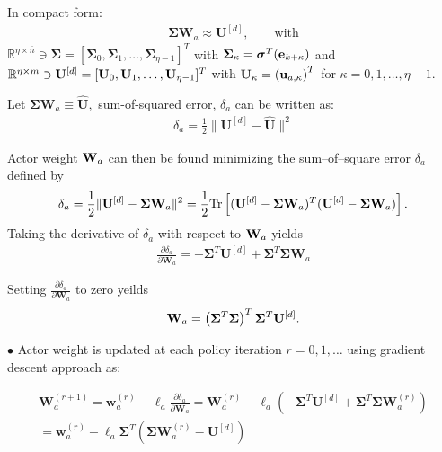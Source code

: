 \documentclass{beamer}
\begin{document}
\begin{frame}
  In compact form:
  \begin{align*}
    \bm{\Sigma}\mathbf{W}_a \approx  \mathbf{U}^{[d]},\qquad\text{with}
  \end{align*}
  $\mathbb{R}^{\eta\times\bar{n}}\ni \bm{\Sigma} = [\bm{\Sigma}_0,\bm{\Sigma}_1,\ldots,\bm{\Sigma}_{\eta -1}]^T$ with $\bm{\Sigma}_\kappa = \bm{\sigma}^T({\bf e}_{k+\kappa})$ and $\mathbb{R}^{\eta\times m}\ni {\bf U}^{[d]} = [{\bf U}_0,{\bf U}_1,\ldots, {\bf U}_{\eta-1}]^T$ with ${\bf U}_\kappa = \left({\bf u}_{a,\kappa}\right)^T$ for $\kappa = 0,1,\ldots,\eta-1.$

  Let $\bm{\Sigma}\mathbf{W}_a\equiv \hat{\mathbf{U}},$ sum-of-squared error, $\delta_a$ can be written as:
  \begin{align*}
    \delta_a = \frac{1}{2}\|\mathbf{U}^{[d]} - \hat{\mathbf{U}}\|^2
  \end{align*}

Actor weight ${\bf W}_a$ can then be found minimizing the sum--of--square error $\delta_a$ defined by %
%
\begin{align*}
  \delta_a = \frac{1}{2}\|{\bf U}^{[d]} - \bm{\Sigma} {\bf W}_a\|^2  = \frac{1}{2}\mathrm{Tr}\left[({\bf U}^{[d]} - \bm{\Sigma} {\bf W}_a)^T({\bf U}^{[d]} - \bm{\Sigma} {\bf W}_a)\right].
\end{align*}
%
Taking the derivative of $\delta_a$ with respect to ${\bf W}_a$ yields 
%
\begin{align}
  \frac{\partial\delta_a}{\partial\mathbf{W}_a} = - \bm{\Sigma}^T\mathbf{U}^{[d]} + \bm{\Sigma}^T \bm{\Sigma}\mathbf{W}_a
  \label{eq:actorWeightsGradient}
\end{align}
%

\end{frame}

\begin{frame}


  Setting $\frac{\partial\delta_a}{\partial\mathbf{W}_a}$ to zero yeilds
  \begin{align*}
    {\bf W}_a = \left(\bm{\Sigma}^T\bm{\Sigma}\right)^T\bm{\Sigma}^T{\bf U}^{[d]}.
  \end{align*}
  
$\bullet$ Actor weight is updated at each policy iteration $r=0,1,\ldots$ using gradient descent approach as:

\begin{multline}
  \mathbf{W}_a^{(r+1)} = \mathbf{w}_a^{(r)} - \ell_a\frac{\partial\delta_a}{\partial\mathbf{W}_a}= \mathbf{W}_a^{(r)} - \ell_a\left(-\bm{\Sigma}^T\mathbf{U}^{[d]} + \bm{\Sigma}^T \bm{\Sigma}\mathbf{W}_a^{(r)}\right)\\
  = \mathbf{w}_a^{(r)}-\ell_a \bm{\Sigma}^T\left(\bm{\Sigma}\mathbf{W}_a^{(r)} - \mathbf{U}^{[d]}\right)
  \label{eq:actorWeightUpdate}
\end{multline}



\end{frame}
\end{document}
